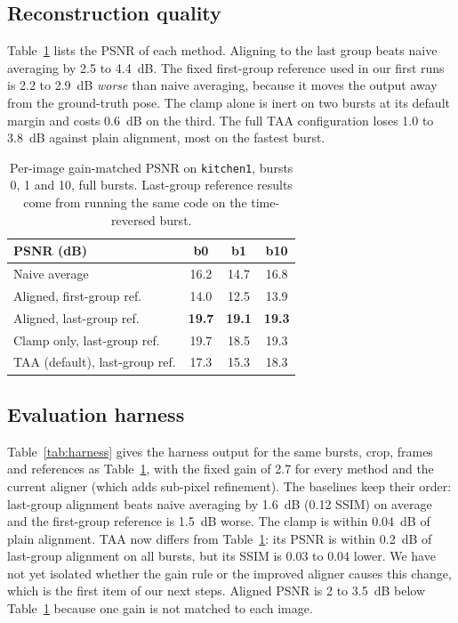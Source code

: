 \documentclass[10pt,twocolumn]{article}
\begin{document}
\subsection{Reconstruction quality}

Table~\ref{tab:psnr} lists the PSNR of each method. Aligning to the last group beats naive averaging by 2.5 to 4.4~dB. The fixed first-group reference used in our first runs is 2.2 to 2.9~dB \emph{worse} than naive averaging, because it moves the output away from the ground-truth pose. The clamp alone is inert on two bursts at its default margin and costs 0.6~dB on the third. The full TAA configuration loses 1.0 to 3.8~dB against plain alignment, most on the fastest burst.

\begin{table}[t]
\centering
\small
\renewcommand{\arraystretch}{1.0}
\begin{tabular}{@{}p{}ccc@{}}
\toprule
\textbf{PSNR (dB)} & \textbf{b0} & \textbf{b1} & \textbf{b10} \\
\midrule
Naive average & 16.2 & 14.7 & 16.8 \\
Aligned, first-group ref. & 14.0 & 12.5 & 13.9 \\
Aligned, last-group ref. & \textbf{19.7} & \textbf{19.1} & \textbf{19.3} \\
Clamp only, last-group ref. & 19.7 & 18.5 & 19.3 \\
TAA (default), last-group ref. & 17.3 & 15.3 & 18.3 \\
\bottomrule
\end{tabular}
\caption{Per-image gain-matched PSNR on \texttt{kitchen1}, bursts 0, 1 and 10, full bursts. Last-group reference results come from running the same code on the time-reversed burst.}
\label{tab:psnr}
\end{table}

\subsection{Evaluation harness}

Table~\ref{tab:harness} gives the harness output for the same bursts, crop, frames and references as Table~\ref{tab:psnr}, with the fixed gain of 2.7 for every method and the current aligner (which adds sub-pixel refinement). The baselines keep their order: last-group alignment beats naive averaging by 1.6~dB (0.12 SSIM) on average and the first-group reference is 1.5~dB worse. The clamp is within 0.04~dB of plain alignment. TAA now differs from Table~\ref{tab:psnr}: its PSNR is within 0.2~dB of last-group alignment on all bursts, but its SSIM is 0.03 to 0.04 lower. We have not yet isolated whether the gain rule or the improved aligner causes this change, which is the first item of our next steps. Aligned PSNR is 2 to 3.5~dB below Table~\ref{tab:psnr} because one gain is not matched to each image.
\end{document}
